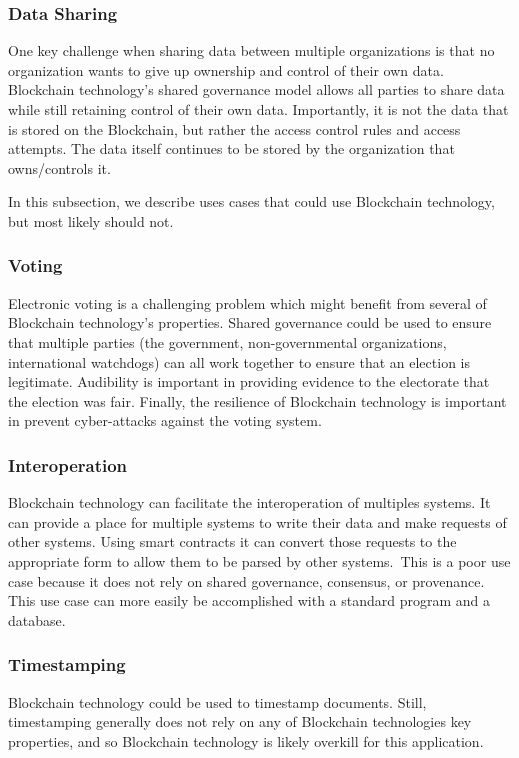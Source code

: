 \subsubsection{Data Sharing}
One key challenge when sharing data between multiple organizations is that no organization wants to give up ownership and control of their own data.
Blockchain technology's shared governance model allows all parties to share data while still retaining control of their own data.
Importantly, it is not the data that is stored on the Blockchain, but rather the access control rules and access attempts.
The data itself continues to be stored by the organization that owns/controls it.

In this subsection, we describe uses cases that could use Blockchain technology, but most likely should not.

\subsubsection{Voting}
Electronic voting is a challenging problem which might benefit from several of Blockchain technology's properties.
Shared governance could be used to ensure that multiple parties (the government, non-governmental organizations, international watchdogs) can all work together to ensure that an election is legitimate.
Audibility is important in providing evidence to the electorate that the election was fair.
Finally, the resilience of Blockchain technology is important in prevent cyber-attacks against the voting system.

\subsubsection{Interoperation}
Blockchain technology can facilitate the interoperation of multiples systems.
It can provide a place for multiple systems to write their data and make requests of other systems.
Using smart contracts it can convert those requests to the appropriate form to allow them to be parsed by other systems.\
This is a poor use case because it does not rely on shared governance, consensus, or provenance.
This use case can more easily be accomplished with a standard program and a database.



\subsubsection{Timestamping}
Blockchain technology could be used to timestamp documents. Still, timestamping generally does not rely on any of Blockchain technologies key properties, and so Blockchain technology is likely overkill for this application.